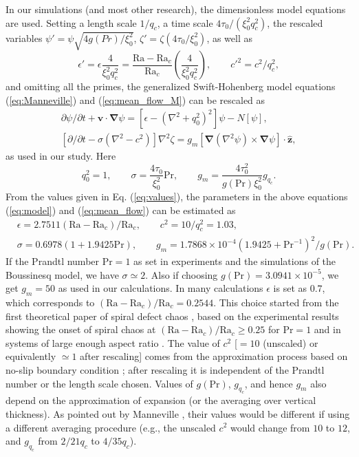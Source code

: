 \documentclass[preprint,prx,floatfix]{revtex4-1}
\begin{document}
In our simulations (and most other research), the dimensionless model equations are used. Setting a length scale $1/q_c$, a time scale $4\tau_0/ (\xi_0^2 q_c^2)$, the rescaled variables $\psi' = \psi\sqrt{4g(Pr)/\xi_0^2}$, $\zeta'=\zeta (4\tau_0/\xi_0^2)$, as well as
\begin{equation}
\epsilon'=\epsilon \frac{4}{\xi_0^2q_c^2} = \frac{\text{Ra}-\text{Ra}_c}{\text{Ra}_c}
\left ( \frac{4}{\xi_0^2q_c^2} \right ), \qquad c'^2=c^2/q_c^2,
\end{equation}
and omitting all the primes, the generalized Swift-Hohenberg model equations (\ref{eq:Manneville}) and (\ref{eq:mean_flow_M}) can be rescaled as
\begin{eqnarray}
&\partial \psi / \partial t + {\bm v} \cdot {\bm \nabla} \psi
= \left [ \epsilon - \left ( \nabla^2 + q_0^2 \right )^2 \right ] \psi
- N[\psi],& \label{eq:model}\\
&\left [ \partial / \partial t - \sigma (\nabla^2 - c^2) \right ] \nabla^2 \zeta
= g_m \left [ {\bm \nabla}(\nabla^2 \psi) \times {\bm \nabla} \psi
\right ] \cdot \hat{\bm z},& \label{eq:mean_flow}
\end{eqnarray}
as used in our study. Here
\begin{equation}
q_0^2=1, \qquad \sigma=\frac{4\tau_0}{\xi_0^2} \text{Pr}, \qquad 
g_m=\frac{4\tau_0^2}{g(\text{Pr})\xi_0^2}g_{q_c}.
\label{eq:para}
\end{equation}
From the values given in Eq. (\ref{eq:values}), the parameters in the above equations (\ref{eq:model}) and (\ref{eq:mean_flow}) can be estimated as
\begin{eqnarray}
&\epsilon=2.7511 (\text{Ra}-\text{Ra}_c)/\text{Ra}_c, \qquad c^2 = 10/q_c^2 = 1.03,&\nonumber\\
&\sigma=0.6978 (1+1.9425 \text{Pr}), \qquad 
g_m=1.7868 \times 10^{-4} (1.9425+{\text{Pr}}^{-1})^2/g(\text{Pr}).&
\end{eqnarray}
If the Prandtl number $\text{Pr}=1$ as set in experiments and the simulations of the Boussinesq model, we have $\sigma \simeq 2$. Also if choosing $g(\text{Pr})=3.0941\times 10^{-5}$, we get $g_m=50$ as used in our calculations. In many calculations $\epsilon$ is set as $0.7$, which corresponds to $(\text{Ra}-\text{Ra}_c)/\text{Ra}_c=0.2544$. This choice started from the first theoretical paper of spiral defect chaos \cite{xi1993spiral}, based on the experimental results showing the onset of spiral chaos at $(\text{Ra}-\text{Ra}_c)/\text{Ra}_c \geq 0.25$ for $\text{Pr}=1$ and in systems of large enough aspect ratio \cite{morris1993spiral,re:liu96}. 
The value of $c^2$ [$=10$ (unscaled) or equivalently $\simeq 1$ after rescaling] comes from the approximation process based on no-slip boundary condition \cite{manneville1984modelisation}; after rescaling it is independent of the Prandtl number or the length scale chosen. Values of $g(\text{Pr})$, $g_{q_c}$, and hence $g_m$ also depend on the approximation of expansion (or the averaging over vertical thickness). As pointed out by Manneville \cite{manneville1984modelisation}, their values would be different if using a different averaging procedure (e.g., the unscaled $c^2$ would change from $10$ to $12$, and $g_{q_c}$ from $2/21q_c$ to $4/35q_c$).
\end{document}
